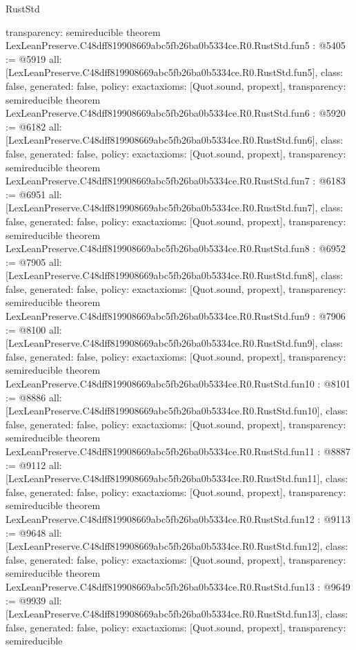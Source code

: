 \begin{lexlean}{RustStd}
\begin{coremodule}
{  transparency: semireducible
}
theorem LexLeanPreserve.C48dff819908669abc5fb26ba0b5334ce.R0.RustStd.fun5 : @5405 := @5919 {
  all: [LexLeanPreserve.C48dff819908669abc5fb26ba0b5334ce.R0.RustStd.fun5],
  class: false,
  generated: false,
  policy: exact{axioms: [Quot.sound, propext]},
  transparency: semireducible
}
theorem LexLeanPreserve.C48dff819908669abc5fb26ba0b5334ce.R0.RustStd.fun6 : @5920 := @6182 {
  all: [LexLeanPreserve.C48dff819908669abc5fb26ba0b5334ce.R0.RustStd.fun6],
  class: false,
  generated: false,
  policy: exact{axioms: [Quot.sound, propext]},
  transparency: semireducible
}
theorem LexLeanPreserve.C48dff819908669abc5fb26ba0b5334ce.R0.RustStd.fun7 : @6183 := @6951 {
  all: [LexLeanPreserve.C48dff819908669abc5fb26ba0b5334ce.R0.RustStd.fun7],
  class: false,
  generated: false,
  policy: exact{axioms: [Quot.sound, propext]},
  transparency: semireducible
}
theorem LexLeanPreserve.C48dff819908669abc5fb26ba0b5334ce.R0.RustStd.fun8 : @6952 := @7905 {
  all: [LexLeanPreserve.C48dff819908669abc5fb26ba0b5334ce.R0.RustStd.fun8],
  class: false,
  generated: false,
  policy: exact{axioms: [Quot.sound, propext]},
  transparency: semireducible
}
theorem LexLeanPreserve.C48dff819908669abc5fb26ba0b5334ce.R0.RustStd.fun9 : @7906 := @8100 {
  all: [LexLeanPreserve.C48dff819908669abc5fb26ba0b5334ce.R0.RustStd.fun9],
  class: false,
  generated: false,
  policy: exact{axioms: [Quot.sound, propext]},
  transparency: semireducible
}
theorem LexLeanPreserve.C48dff819908669abc5fb26ba0b5334ce.R0.RustStd.fun10 : @8101 := @8886 {
  all: [LexLeanPreserve.C48dff819908669abc5fb26ba0b5334ce.R0.RustStd.fun10],
  class: false,
  generated: false,
  policy: exact{axioms: [Quot.sound, propext]},
  transparency: semireducible
}
theorem LexLeanPreserve.C48dff819908669abc5fb26ba0b5334ce.R0.RustStd.fun11 : @8887 := @9112 {
  all: [LexLeanPreserve.C48dff819908669abc5fb26ba0b5334ce.R0.RustStd.fun11],
  class: false,
  generated: false,
  policy: exact{axioms: [Quot.sound, propext]},
  transparency: semireducible
}
theorem LexLeanPreserve.C48dff819908669abc5fb26ba0b5334ce.R0.RustStd.fun12 : @9113 := @9648 {
  all: [LexLeanPreserve.C48dff819908669abc5fb26ba0b5334ce.R0.RustStd.fun12],
  class: false,
  generated: false,
  policy: exact{axioms: [Quot.sound, propext]},
  transparency: semireducible
}
theorem LexLeanPreserve.C48dff819908669abc5fb26ba0b5334ce.R0.RustStd.fun13 : @9649 := @9939 {
  all: [LexLeanPreserve.C48dff819908669abc5fb26ba0b5334ce.R0.RustStd.fun13],
  class: false,
  generated: false,
  policy: exact{axioms: [Quot.sound, propext]},
  transparency: semireducible
}
\end{coremodule}
\end{lexlean}
